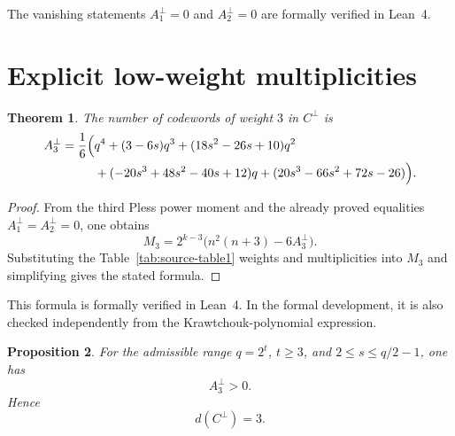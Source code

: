 \documentclass[11pt]{article}
\newtheorem{theorem}{Theorem}
\newtheorem{proposition}[theorem]{Proposition}
\begin{document}
The vanishing statements $A_1^{\perp}=0$ and $A_2^{\perp}=0$ are formally verified in Lean~4.

\section{Explicit low-weight multiplicities}

\begin{theorem}
The number of codewords of weight $3$ in $C^{\perp}$ is
\begin{equation}
\begin{aligned}
A_3^{\perp}
=\frac{1}{6}\Bigl(&q^4+(3-6s)q^3+(18s^2-26s+10)q^2 \\
&+(-20s^3+48s^2-40s+12)q+(20s^3-66s^2+72s-26)\Bigr).
\end{aligned}
\end{equation}
\end{theorem}

\begin{proof}
From the third Pless power moment and the already proved equalities $A_1^{\perp}=A_2^{\perp}=0$, one obtains
\begin{equation}
M_3=2^{k-3}\bigl(n^2(n+3)-6A_3^{\perp}\bigr).
\end{equation}
Substituting the Table~\ref{tab:source-table1} weights and multiplicities into $M_3$ and simplifying gives the stated formula.
\end{proof}

This formula is formally verified in Lean~4. In the formal development, it is also checked independently from the Krawtchouk-polynomial expression.

\begin{proposition}
For the admissible range $q=2^t$, $t\ge 3$, and $2\le s\le q/2-1$, one has
\begin{equation}
A_3^{\perp}>0.
\end{equation}
Hence
\begin{equation}
d(C^{\perp})=3.
\end{equation}
\end{proposition}
\end{document}
